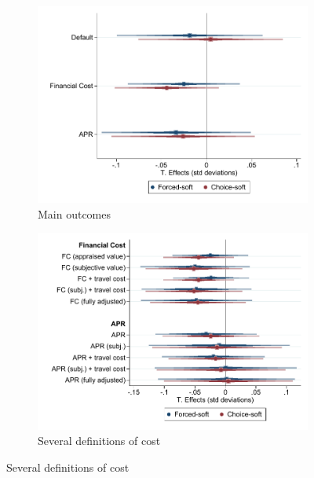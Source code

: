 \documentclass[oneside,11pt]{article}
\begin{document}
\cleardoublepage



\begin{figure}[H]
     \caption{Effect of Soft Commitment Arms}
    \label{effect_promises}
    \begin{center}
    \begin{subfigure}{0.45\textwidth}
        \caption{Main outcomes}
        \centering
        \includegraphics[width=\textwidth]{Figuras/soft_te.pdf}
    \end{subfigure}
        \begin{subfigure}{0.45\textwidth}
            \caption{Several definitions of cost}
        \centering
        \includegraphics[width=\textwidth]{Figuras/fc_robustness_soft.pdf}
    \end{subfigure}

\end{center}
\end{figure}
\end{document}
